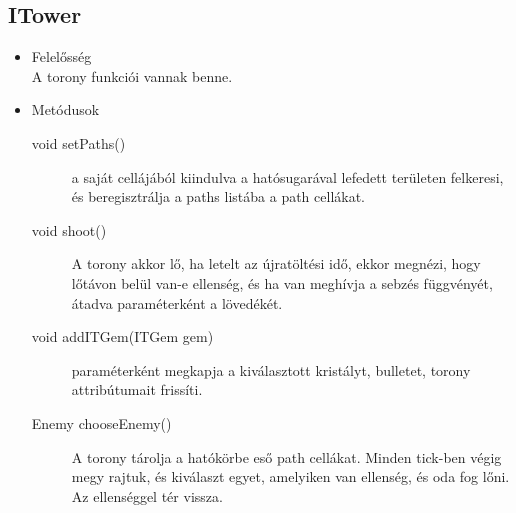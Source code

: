 \subsection{ITower}
\begin{itemize}
\item Felelősség\\
A torony funkciói vannak benne.
\item Metódusok\\
	\begin{description}
		\item[void setPaths()] a saját cellájából kiindulva a hatósugarával lefedett területen felkeresi, és beregisztrálja a paths listába a path cellákat.
\item[void shoot()] A torony akkor lő, ha letelt az újratöltési idő, ekkor megnézi, hogy lőtávon belül van-e ellenség, és ha van meghívja a sebzés függvényét, átadva paraméterként a lövedékét. 
\item[void addITGem(ITGem gem)] paraméterként megkapja a kiválasztott kristályt, bulletet, torony attribútumait frissíti.
\item[Enemy chooseEnemy()] A torony tárolja a hatókörbe eső path cellákat. Minden tick-ben végig megy rajtuk, és kiválaszt egyet, amelyiken van ellenség, és oda fog lőni. Az ellenséggel tér vissza.

		
		
	\end{description}
\end{itemize}
